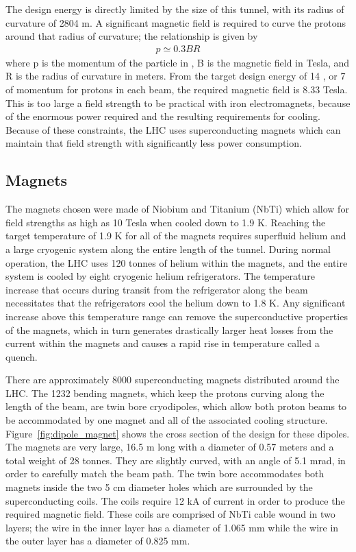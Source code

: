 The design energy is directly limited by the size of this tunnel, with its radius of curvature of 2804 m. 
A significant magnetic field is required to curve the protons around that radius of curvature; the relationship is given by
\begin{align}
p \simeq 0.3BR \label{eq:magnetic_bending}
\end{align}
\noindent where p is the momentum of the particle in \GeV, B is the magnetic field in Tesla, and R is the radius of curvature in meters. 
From the target design energy of 14 \TeV, or 7 \TeV of momentum for protons in each beam, the required magnetic field is 8.33 Tesla.
This is too large a field strength to be practical with iron electromagnets, because of the enormous power required and the resulting requirements for cooling.
Because of these constraints, the \ac{LHC} uses superconducting magnets which can maintain that field strength with significantly less power consumption.

\subsection{Magnets}

The magnets chosen were made of Niobium and Titanium (NbTi) which allow for field strengths as high as 10 Tesla when cooled down to 1.9 K.
Reaching the target temperature of  1.9 K for all of the magnets requires superfluid helium and a large cryogenic system along the entire length of the tunnel.
During normal operation, the \ac{LHC} uses 120 tonnes of helium within the magnets, and the entire system is cooled by eight cryogenic helium refrigerators.
The temperature increase that occurs during transit from the refrigerator along the beam necessitates that the refrigerators cool the helium down to 1.8 K.
Any significant increase above this temperature range can remove the superconductive properties of the magnets, which in turn generates drastically larger heat losses from the current within the magnets and causes a rapid rise in temperature called a quench.

There are approximately 8000 superconducting magnets distributed around the \ac{LHC}.
The 1232 bending magnets, which keep the protons curving along the length of the beam, are twin bore cryodipoles, which allow both proton beams to be accommodated by one magnet and all of the associated cooling structure.
Figure~\ref{fig:dipole_magnet} shows the cross section of the design for these dipoles. 
The magnets are very large, 16.5 m long with a diameter of 0.57 meters and a total weight of 28 tonnes. 
They are slightly curved, with an angle of 5.1 mrad, in order to carefully match the beam path.
The twin bore accommodates both magnets inside the two 5 cm diameter holes which are surrounded by the superconducting coils.
The coils require 12 kA of current in order to produce the required magnetic field.
These coils are comprised of NbTi cable wound in two layers; the wire in the inner layer has a diameter of 1.065 mm while the wire in the outer layer has a diameter of 0.825 mm. 

